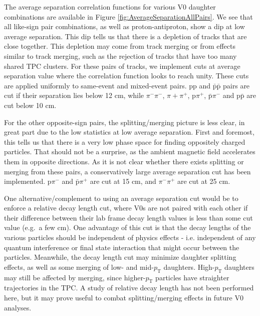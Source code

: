 The average separation correlation functions for various V0 daughter combinations are available in Figure \ref{fig:AverageSeparationAllPairs}.  
We see that all like-sign pair combinations, as well as proton-antiproton, show a dip at low average separation.  
This dip tells us that there is a depletion of tracks that are close together. 
This depletion may come from track merging or from effects similar to track merging, such as the rejection of tracks that have too many shared TPC clusters.
For these pairs of tracks, we implement cuts at average separation value where the correlation function looks to reach unity.
These cuts are applied uniformly to same-event and mixed-event pairs.
pp and $\bar{\mathrm{p}}\bar{\mathrm{p}}$ pairs are cut if their separation lies below 12 cm, while $\pi^-\pi^-$, $\pi+\pi^+$, p$\pi^+$, $\bar{\mathrm{p}}\pi^-$ and p$\bar{\mathrm{p}}$ are cut below 10 cm.

For the other opposite-sign pairs, the splitting/merging picture is less clear, in great part due to the low statistics at low average separation.
First and foremost, this tells us that there is a very low phase space for finding oppositely charged particles. 
That should not be a surprise, as the ambient magnetic field accelerates them in opposite directions.
As it is not clear whether there exists splitting or merging from these pairs, a conservatively large average separation cut has been implemented. p$\pi^-$ and $\bar{\mathrm{p}}\pi^+$ are cut at 15 cm, and $\pi^-\pi^+$ are cut at 25 cm.

One alternative/complement to using an average separation cut would be to enforce a relative decay length cut, where V0s are not paired with each other if their difference between their lab frame decay length values is less than some cut value (e.g.\ a few cm).  
One advantage of this cut is that the decay lengths of the various particles should be independent of physics effects - i.e. independent of any quantum interference or final state interaction that might occur between the particles.  
Meanwhile, the decay length cut may minimize daughter splitting effects, as well as some merging of low- and mid-$p_{\mathrm{T}}$ daughters.  
High-$p_{\mathrm{T}}$ daughters may still be affected by merging, since higher-$p_{\mathrm{T}}$ particles have straighter trajectories in the TPC.  
A study of relative decay length has not been performed here, but it may prove useful to combat splitting/merging effects in future V0 analyses.

